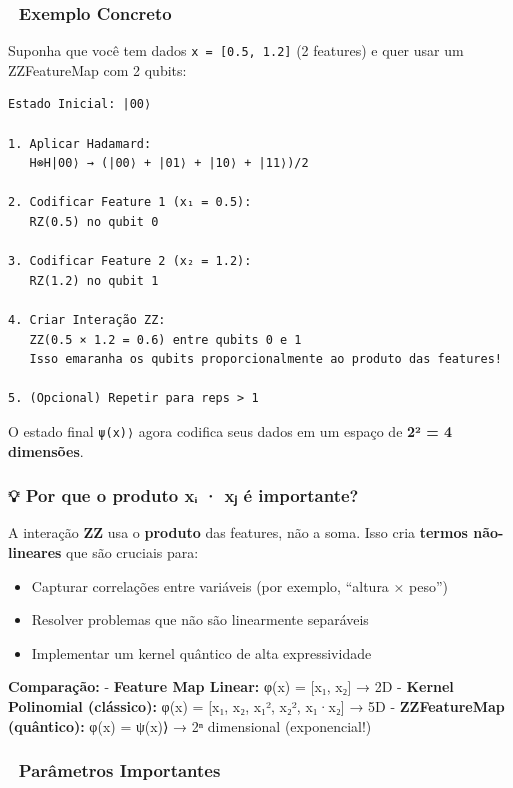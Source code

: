 \documentclass[
  brazilian,
]{report}
\providecommand{\tightlist}{%
  \setlength{\itemsep}{0pt}\setlength{\parskip}{0pt}}
\begin{document}
\subsubsection{🎯 Exemplo Concreto}\label{exemplo-concreto}

Suponha que você tem dados \texttt{x\ =\ {[}0.5,\ 1.2{]}} (2 features) e
quer usar um ZZFeatureMap com 2 qubits:

\begin{verbatim}
Estado Inicial: |00⟩

1. Aplicar Hadamard:
   H⊗H|00⟩ → (|00⟩ + |01⟩ + |10⟩ + |11⟩)/2

2. Codificar Feature 1 (x₁ = 0.5):
   RZ(0.5) no qubit 0

3. Codificar Feature 2 (x₂ = 1.2):
   RZ(1.2) no qubit 1

4. Criar Interação ZZ:
   ZZ(0.5 × 1.2 = 0.6) entre qubits 0 e 1
   Isso emaranha os qubits proporcionalmente ao produto das features!

5. (Opcional) Repetir para reps > 1
\end{verbatim}

O estado final \texttt{\textbar{}ψ(x)⟩} agora codifica seus dados em um
espaço de \textbf{2² = 4 dimensões}.

\subsubsection{💡 Por que o produto xᵢ · xⱼ é
importante?}\label{por-que-o-produto-xux1d62-xux2c7c-uxe9-importante}

A interação \textbf{ZZ} usa o \textbf{produto} das features, não a soma.
Isso cria \textbf{termos não-lineares} que são cruciais para:

\begin{itemize}
\tightlist
\item
  Capturar correlações entre variáveis (por exemplo, ``altura × peso'')
\item
  Resolver problemas que não são linearmente separáveis
\item
  Implementar um kernel quântico de alta expressividade
\end{itemize}

\textbf{Comparação:} - \textbf{Feature Map Linear:} φ(x) = {[}x₁, x₂{]}
→ 2D - \textbf{Kernel Polinomial (clássico):} φ(x) = {[}x₁, x₂, x₁²,
x₂², x₁·x₂{]} → 5D - \textbf{ZZFeatureMap (quântico):} φ(x) =
\textbar ψ(x)⟩ → 2ⁿ dimensional (exponencial!)

\subsubsection{🔢 Parâmetros
Importantes}\label{paruxe2metros-importantes}
\end{document}
